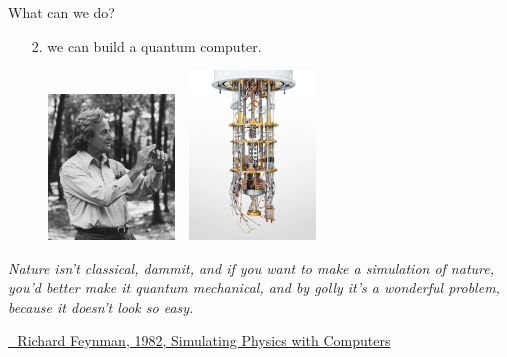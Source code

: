 \documentclass[aspectratio=169, 10pt, xcolor={svgnames}, hyperref={linkcolor=black}]{beamer}
\begin{document}
\begin{frame}{What can we do?}
\pause
\begin{itemize}[noitemsep]
\pause
\item[2.] we can build a quantum computer.
\end{itemize}
\pause
\begin{figure}
   \includegraphics[width=0.3\textwidth, height=0.55\textheight]{figures/feynmann.jpg}%
   $\,\,$ \pause
   \includegraphics[width=0.3\textwidth, height=0.55\textheight]{figures/qcomp.png}
\end{figure}

\small
\textit{Nature isn't classical, dammit, and if you want to make a simulation of nature,
you'd better make it quantum mechanical, and by golly it's a wonderful problem,
because it doesn't look so easy.}

\href{https://link.springer.com/article/10.1007/BF02650179}{\faBook\,\, Richard Feynman, 1982, Simulating Physics with Computers}
\end{frame}
\end{document}
